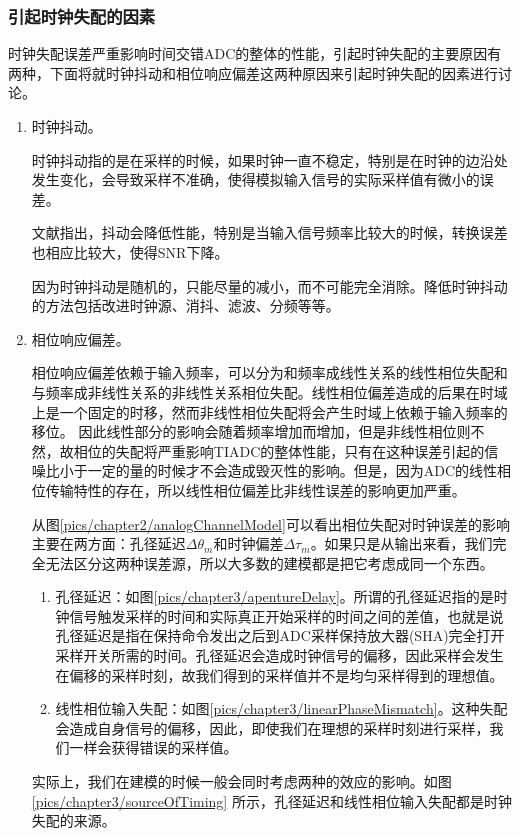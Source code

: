 		\subsubsection{引起时钟失配的因素}\label{sec:sourceOfTiming}
			时钟失配误差严重影响时间交错ADC的整体的性能，引起时钟失配的主要原因有两种，下面将就时钟抖动和相位响应偏差这两种原因来引起时钟失配的因素进行讨论。\par
			\begin{enumerate}
				\item 时钟抖动。\par
					时钟抖动指的是在采样的时候，如果时钟一直不稳定，特别是在时钟的边沿处发生变化，会导致采样不准确，使得模拟输入信号的实际采样值有微小的误差。\par
					文献\cite{jiao2013estimation}指出，抖动会降低性能，特别是当输入信号频率比较大的时候，转换误差也相应比较大，使得SNR下降。\par
					因为时钟抖动是随机的，只能尽量的减小，而不可能完全消除。降低时钟抖动的方法包括改进时钟源、消抖、滤波、分频等等。\par
				\item 相位响应偏差。\par
					相位响应偏差依赖于输入频率，可以分为和频率成线性关系的线性相位失配和与频率成非线性关系的非线性关系相位失配。线性相位偏差造成的后果在时域上是一个固定的时移，然而非线性相位失配将会产生时域上依赖于输入频率的移位。 		因此线性部分的影响会随着频率增加而增加，但是非线性相位则不然，故相位的失配将严重影响TIADC的整体性能，只有在这种误差引起的信噪比小于一定的量的时候才不会造成毁灭性的影响。但是，因为ADC的线性相位传输特性的存在，所以线性相位偏差比非线性误差的影响更加严重。\par
					
				从图\ref{pics/chapter2/analogChannelModel}可以看出相位失配对时钟误差的影响主要在两方面：孔径延迟$\Delta  \theta _m$和时钟偏差$\Delta \tau _m$。如果只是从输出来看，我们完全无法区分这两种误差源，所以大多数的建模都是把它考虑成同一个东西。
				\begin{enumerate}
					\item 孔径延迟：如图\ref{pics/chapter3/apentureDelay}。所谓的孔径延迟指的是时钟信号触发采样的时间和实际真正开始采样的时间之间的差值，也就是说孔径延迟是指在保持命令发出之后到ADC采样保持放大器(SHA)完全打开采样开关所需的时间。孔径延迟会造成时钟信号的偏移，因此采样会发生在偏移的采样时刻，故我们得到的采样值并不是均匀采样得到的理想值。
					\item 线性相位输入失配：如图\ref{pics/chapter3/linearPhaseMismatch}。这种失配会造成自身信号的偏移，因此，即使我们在理想的采样时刻进行采样，我们一样会获得错误的采样值。
				\end{enumerate}
					实际上，我们在建模的时候一般会同时考虑两种的效应的影响。如图\ref{pics/chapter3/sourceOfTiming} 所示，孔径延迟和线性相位输入失配都是时钟失配的来源。
				\end{enumerate}
		
